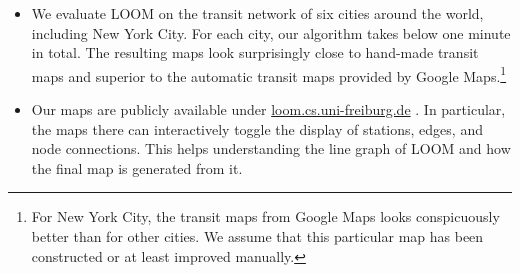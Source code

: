 \documentclass{llncs}
\newcommand\TODO[1]{\textcolor{blue}{\small [TODO: #1]}}
\begin{document}
\begin{itemize}[parsep=0.5mm,leftmargin=0mm,itemindent=4mm]
\item We evaluate LOOM on the transit network of six cities around the world, including New York City. For each city, our algorithm takes below one minute in total. The resulting maps look surprisingly close to hand-made transit maps and superior to the automatic transit maps provided by Google Maps.\footnote{For New York City, the transit maps from Google Maps looks conspicuously better than for other cities. We assume that this particular map has been constructed or at least improved manually.}

\item Our maps are publicly available under \url{loom.cs.uni-freiburg.de} . In particular, the maps there can interactively toggle the display of stations, edges, and node connections. This helps understanding the line graph of LOOM and how the final map is generated from it.

%
%

\end{itemize}



\end{document}
